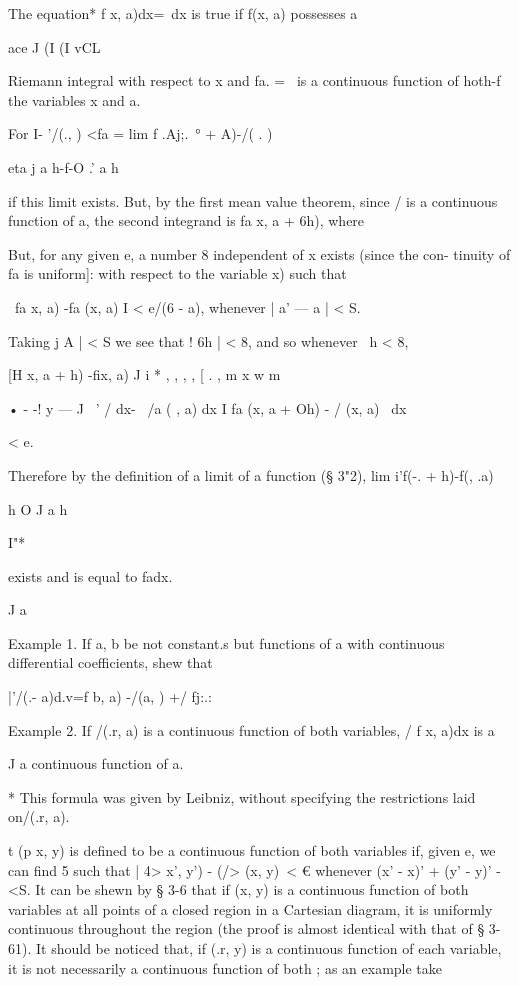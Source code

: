 The equation*   f x, a)dx=\   dx is true if f(x, a) possesses a 

ace J (I   (I vCL 

Riemann integral with respect to x and fa.   =  \ is a continuous function of 
hoth-f the variables x and a. 

For I-  '/(.,  ) <fa = lim f .Aj;.\ ° + A)-/( . )   

eta j a h-f-O .' a h 

if this limit exists. But, by the first mean value theorem, since /  is a 
continuous function of a, the second integrand is fa  x, a + 6h), where 

But, for any given e, a number 8 independent of x exists (since the con- 
tinuity of fa is uniform]: with respect to the variable x) such that 

\ fa  x, a) -fa (x, a) I < e/(6 - a), 
whenever | a' — a | < S. 

Taking j A | < S we see that ! 6h | < 8, and so whenever \ h < 8, 

[H x, a + h) -fix, a) J i * , , , , [  . , m x  w m   

• - -! y — J \ ' / dx- \ /a ( , a) dx   I fa (x, a + Oh) - /  (x, a) \ dx 

< e. 

Therefore by the definition of a limit of a function (§ 3"2), 
lim i'f(-.  + h)-f(, .a)  

h O J a h 

I"* 

exists and is equal to fadx. 

J a 

Example 1. If a, b be not constant.s but functions of a with continuous differential 
coefficients, shew that 

 |'/(.- a)d.v=f b, a) -/(a,  )   +/  fj:.: 

Example 2. If /(.r, a) is a continuous function of both variables, / f x, a)dx is a 

J a 
continuous function of a. 

* This formula was given by Leibniz, without specifying the restrictions laid on/(.r, a). 

t (p  x, y) is defined to be a continuous function of both variables if, given e, we can find 
5 such that | 4>  x', y') - (/> (x, y)\ < € whenever  (x' - x)'  + (y' - y)' -<S. It can be shewn by § 3-6 
that if   (x, y) is a continuous function of both variables at all points of a closed region in 
a Cartesian diagram, it is uniformly continuous throughout the region (the proof is almost 
identical with that of § 3-61). It should be noticed that, if  (.r, y) is a continuous function 
of each variable, it is not necessarily a continuous function of both ; as an example take 


